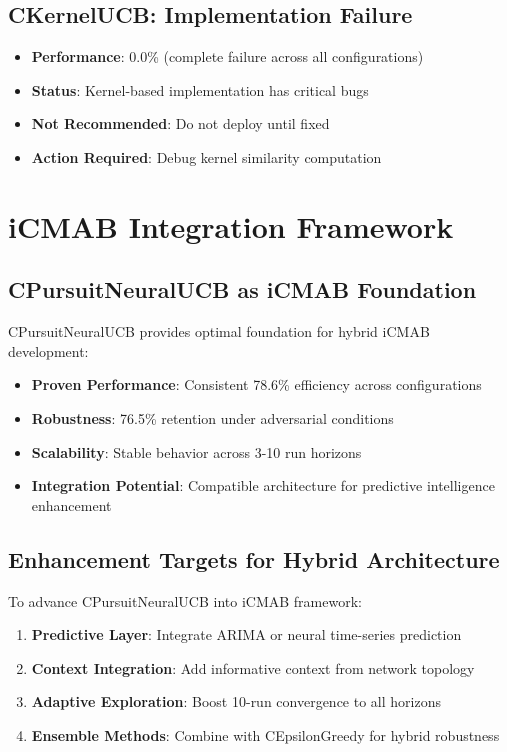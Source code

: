\documentclass[12pt,a4paper]{article}
\newcommand{\warning}[1]{\textcolor{warningred}{\textbf{#1}}}
\begin{document}
\subsection{CKernelUCB: Implementation Failure}

\begin{itemize}
\item \textbf{Performance}: 0.0\% (complete failure across all configurations)
\item \warning{Status}: Kernel-based implementation has critical bugs
\item \warning{Not Recommended}: Do not deploy until fixed
\item \textbf{Action Required}: Debug kernel similarity computation
\end{itemize}

\section{iCMAB Integration Framework}

\subsection{CPursuitNeuralUCB as iCMAB Foundation}

CPursuitNeuralUCB provides optimal foundation for hybrid iCMAB development:

\begin{itemize}
\item \textbf{Proven Performance}: Consistent 78.6\% efficiency across configurations
\item \textbf{Robustness}: 76.5\% retention under adversarial conditions
\item \textbf{Scalability}: Stable behavior across 3-10 run horizons
\item \textbf{Integration Potential}: Compatible architecture for predictive intelligence enhancement
\end{itemize}

\subsection{Enhancement Targets for Hybrid Architecture}

To advance CPursuitNeuralUCB into iCMAB framework:

\begin{enumerate}
\item \textbf{Predictive Layer}: Integrate ARIMA or neural time-series prediction
\item \textbf{Context Integration}: Add informative context from network topology
\item \textbf{Adaptive Exploration}: Boost 10-run convergence to all horizons
\item \textbf{Ensemble Methods}: Combine with CEpsilonGreedy for hybrid robustness
\end{enumerate}
\end{document}
